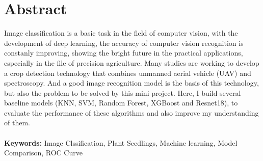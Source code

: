 \documentclass[11pt]{article}
\begin{document}



\doublespacing
\linenumbers 
\section{Abstract}
Image classification is a basic task in the field of computer vision, with the development of deep learning, the accuracy of computer vision recognition is constanly improving, showing the bright future in the practical applications, especially in the file of precision agriculture. Many studies are working to develop a crop detection technology that combines unmanned aerial vehicle (UAV) and spectroscopy. And a good image recognition model is the basis of this technology, but also the problem to be solved by this mini project. Here, I build several baseline models (KNN, SVM, Random Forest, XGBoost and Resnet18), to evaluate the performance of these algorithms and also improve my understanding of them. 
\\
\\
\textbf{Keywords:} Image Clssification, Plant Seedlings, Machine learning, Model Comparison, ROC Curve
\end{document}
